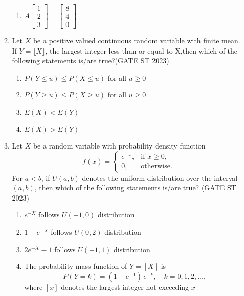 \documentclass[journal]{IEEEtran}
\begin{document}
\begin{enumerate}[label=\textbf{Q.\arabic*.}, start=1, align=left, itemsep=2em]
\begin{enumerate}[label=\textbf{Q.\arabic*.}, start=11, align=left, itemsep=2em]
\begin{enumerate}[label=(\Alph*)]
\item $A\begin{bmatrix}1\\2\\3\end{bmatrix} = \begin{bmatrix}8\\4\\0\end{bmatrix}$
\end{enumerate}

\item Let $X$ be a positive valued continuous random variable with finite mean. If $Y = \lfloor X \rfloor$, the largest integer less than or equal to X,then which of the following statements is/are true?\hfill(GATE ST 2023) \\
\begin{enumerate}[label=(\Alph*)]
\item $P(Y \le u) \le P(X \le u)$ for all $u \ge 0$
\item $P(Y \ge u) \le P(X \ge u)$ for all $u \ge 0$
\item $E(X) < E(Y)$
\item $E(X) > E(Y)$
\end{enumerate}

\item Let $X$ be a random variable with probability density function  
\[
f(x) = 
\begin{cases}
e^{-x}, & \text{if } x \ge 0, \\
0, & \text{otherwise}.
\end{cases}
\]
For $a < b$, if $U(a, b)$ denotes the uniform distribution over the interval $(a, b)$,  
then which of the following statements is/are true?  \hfill(GATE ST 2023)

\begin{enumerate}[label=(\Alph*)]
    \item $e^{-X}$ follows $U(-1, 0)$ distribution
    \item $1 - e^{-X}$ follows $U(0, 2)$ distribution
    \item $2 e^{-X} - 1$ follows $U(-1, 1)$ distribution
    \item The probability mass function of $Y = [X]$ is  
    \[
    P(Y = k) = (1 - e^{-1}) \, e^{-k}, \quad k = 0, 1, 2, \dots,
    \]
    where $[x]$ denotes the largest integer not exceeding $x$
\end{enumerate}




\end{enumerate}
\end{enumerate}
\end{document}
